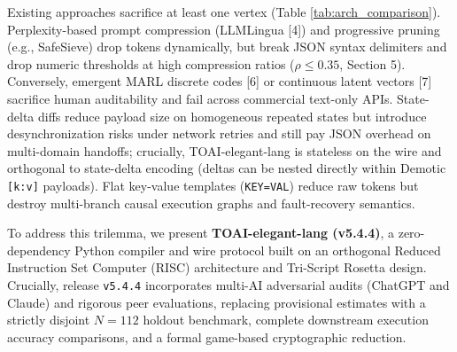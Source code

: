 \documentclass[9pt,a4paper]{extarticle}
\begin{document}
Existing approaches sacrifice at least one vertex (Table \ref{tab:arch_comparison}). Perplexity-based prompt compression (LLMLingua [4]) and progressive pruning (e.g., SafeSieve) drop tokens dynamically, but break JSON syntax delimiters and drop numeric thresholds at high compression ratios ($\rho \le 0.35$, Section 5). Conversely, emergent MARL discrete codes [6] or continuous latent vectors [7] sacrifice human auditability and fail across commercial text-only APIs. State-delta diffs reduce payload size on homogeneous repeated states but introduce desynchronization risks under network retries and still pay JSON overhead on multi-domain handoffs; crucially, TOAI-elegant-lang is stateless on the wire and orthogonal to state-delta encoding (deltas can be nested directly within Demotic \texttt{[k:v]} payloads). Flat key-value templates (\texttt{KEY=VAL}) reduce raw tokens but destroy multi-branch causal execution graphs and fault-recovery semantics.

To address this trilemma, we present \textbf{TOAI-elegant-lang (v5.4.4)}, a zero-dependency Python compiler and wire protocol built on an orthogonal Reduced Instruction Set Computer (RISC) architecture and Tri-Script Rosetta design. Crucially, release \texttt{v5.4.4} incorporates multi-AI adversarial audits (ChatGPT and Claude) and rigorous peer evaluations, replacing provisional estimates with a strictly disjoint $N=112$ holdout benchmark, complete downstream execution accuracy comparisons, and a formal game-based cryptographic reduction.
\end{document}
